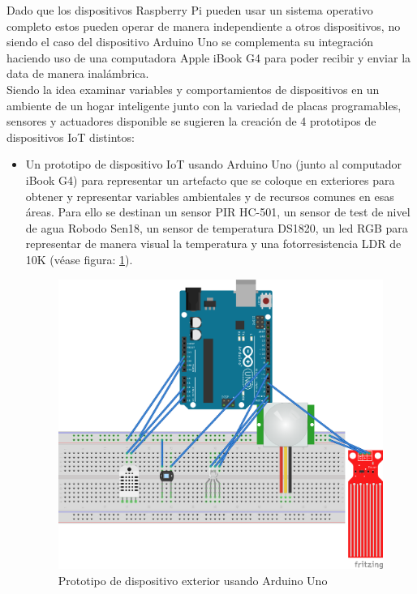 Dado que los dispositivos Raspberry Pi pueden usar un sistema operativo completo estos pueden operar de manera independiente a otros dispositivos, no siendo el caso del dispositivo Arduino Uno se complementa su integración haciendo uso de una computadora Apple iBook G4 para poder recibir y enviar la data de manera inalámbrica.\\

Siendo la idea examinar variables y comportamientos de dispositivos en un ambiente de un hogar inteligente junto con la variedad de placas programables, sensores y actuadores disponible se sugieren la creación de 4 prototipos de dispositivos IoT distintos:

\begin{itemize}
\item Un prototipo de dispositivo IoT usando Arduino Uno (junto al computador iBook G4) para representar un artefacto que se coloque en exteriores para obtener y representar variables ambientales y de recursos comunes en esas áreas. Para ello se destinan un sensor PIR HC-501, un sensor de test de nivel de agua Robodo Sen18, un sensor de temperatura DS1820, un led RGB para representar de manera visual la temperatura y una fotorresistencia LDR de 10K (véase figura: \ref{fig:arduino1}).
\begin{figure}[htb]
\centering
\includegraphics[scale=0.5]{./Figuras/arduino1.png}
\caption{Prototipo de dispositivo exterior usando Arduino Uno}
\label{fig:arduino1}
\vspace*{-10pt}
\end{figure}


\end{itemize}
